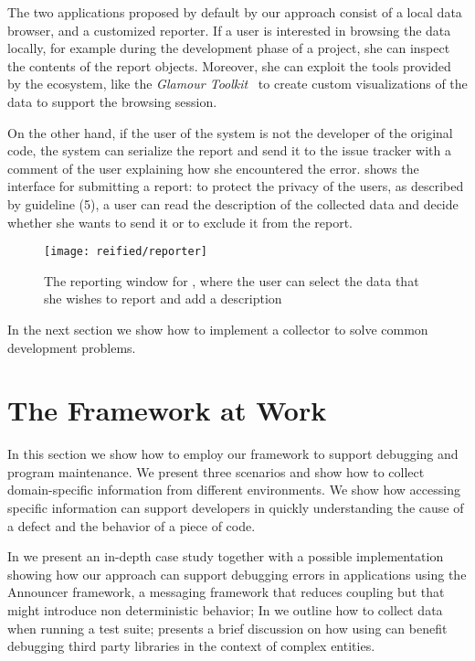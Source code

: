 The two applications proposed by default by our approach consist of a local data browser, and a customized reporter.
If a user is interested in browsing the data locally, for example during the development phase of a project, she can inspect the contents of the report objects.
Moreover, she can exploit the tools provided by the \pha ecosystem, like the \emph{Glamour Toolkit}~\cite{Girb2013a} to create custom visualizations of the data to support the browsing session.

On the other hand, if the user of the system is not the developer of the original code, the system can serialize the report and send it to the issue tracker with a comment of the user explaining how she encountered the error.
 shows the interface for submitting a report: to protect the privacy of the users, as described by guideline (5), a user can read the description of the collected data and decide whether she wants to send it or to exclude it from the report.

\begin{figure}[ht]
  \centering
  \texttt{[image: reified/reporter]}
  \caption[The reporting window for \sln]{The reporting window for \sln, where the user can select the data that she wishes to report and add a description}
  \label{fig:reporter}
\end{figure}

In the next section we show how to implement a collector to solve common development problems.


\section{The Framework at Work}\label{sec:reified-stories}

In this section we show how to employ our framework to support debugging and program maintenance.
We present three scenarios and show how to collect domain-specific information from different environments.
We show how accessing specific information can support developers in quickly understanding the cause of a defect and the behavior of a piece of code.

In  we present an in-depth case study together with a possible implementation showing how our approach can support debugging errors in applications using the Announcer framework, a messaging framework that reduces coupling but that might introduce non deterministic behavior; In  we outline how to collect data when running a test suite;  presents a brief discussion on how using \sln can benefit debugging third party libraries in the context of complex entities.

